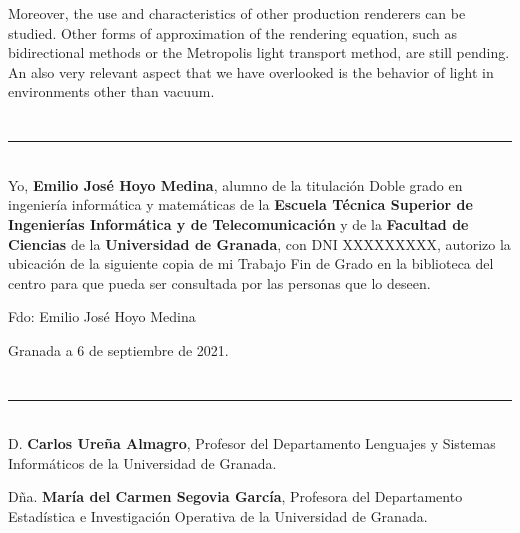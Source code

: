 Moreover, the use and characteristics of other production renderers can be studied. Other forms of approximation of the rendering equation, such as bidirectional methods or the Metropolis light transport method, are still pending. An also very relevant aspect that we have overlooked is the behavior of light in environments other than vacuum. 


\chapter*{}
\thispagestyle{empty}

\noindent\rule[-1ex]{\textwidth}{2pt}\\[4.5ex]

Yo, \textbf{Emilio José Hoyo Medina}, alumno de la titulación Doble grado en ingeniería informática y matemáticas de la \textbf{Escuela Técnica Superior
de Ingenierías Informática y de Telecomunicación} y de la \textbf{Facultad de Ciencias} de la \textbf{Universidad de Granada}, con DNI XXXXXXXXX, autorizo la
ubicación de la siguiente copia de mi Trabajo Fin de Grado en la biblioteca del centro para que pueda ser
consultada por las personas que lo deseen.

\vspace{6cm}

\noindent Fdo: Emilio José Hoyo Medina

\vspace{2cm}

\begin{flushright}
Granada a 6 de septiembre de 2021.
\end{flushright}


\chapter*{}
\thispagestyle{empty}

\noindent\rule[-1ex]{\textwidth}{2pt}\\[4.5ex]

D. \textbf{Carlos Ureña Almagro}, Profesor del Departamento Lenguajes y Sistemas Informáticos de la Universidad de Granada.

\vspace{0.5cm}

Dña. \textbf{María del Carmen Segovia García}, Profesora del Departamento Estadística e Investigación Operativa de la Universidad de Granada.


\vspace{0.5cm}

